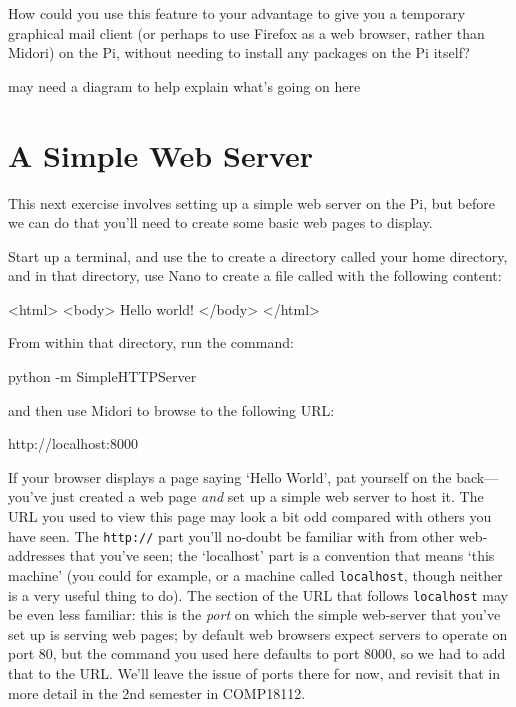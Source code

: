 How could you use this feature to your advantage to give you a temporary graphical mail client (or perhaps to use Firefox as a web browser, rather than Midori) on the Pi, without needing to install any packages on the Pi itself? 

\begin{note}
may need a diagram to help explain what's going on here
\end{note}

\section{A Simple Web Server}

This next exercise involves setting up a simple web server on the Pi, but before we can do that you'll need to create some basic web pages to display. 

Start up a terminal, and use the  to create a directory called  your home directory, and in that directory, use Nano to create a file called  with the following content:

\begin{ttoutenv}
<html>
<body>
Hello world!
</body>
</html>
\end{ttoutenv}

From within that directory, run the command:

\begin{ttoutenv}
python -m SimpleHTTPServer
\end{ttoutenv}

and then use Midori to browse to the following URL:

\begin{ttoutenv}
http://localhost:8000
\end{ttoutenv}

If your browser displays a page saying `Hello World', pat yourself on the back---you've just created a web page \textit{and} set up a simple web server to host it. The URL you used to view this page may look a bit odd compared with others you have seen. The \texttt{http://} part you'll no-doubt be familiar with from other web-addresses that you've seen; the `localhost' part is a convention that means `this machine' (you could for example,  or  a machine called \texttt{localhost}, though neither is a very useful thing to do). The section of the URL that follows \texttt{localhost} may be even less familiar: this is the \textit{port} on which the simple web-server that you've set up is serving web pages; by default web browsers expect servers to operate on port 80, but the  command you used here defaults to port 8000, so we had to add that to the URL. We'll leave the issue of ports there for now, and revisit that in more detail in the 2nd semester in COMP18112. 

